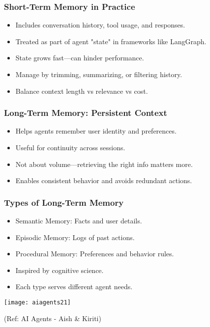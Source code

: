 \begin{frame}[fragile]\frametitle{Short-Term Memory in Practice}
\begin{itemize}
  \item Includes conversation history, tool usage, and responses.
  \item Treated as part of agent "state" in frameworks like LangGraph.
  \item State grows fast—can hinder performance.
  \item Manage by trimming, summarizing, or filtering history.
  \item Balance context length vs relevance vs cost.
\end{itemize}
\end{frame}

\begin{frame}[fragile]\frametitle{Long-Term Memory: Persistent Context}
\begin{itemize}
  \item Helps agents remember user identity and preferences.
  \item Useful for continuity across sessions.
  \item Not about volume—retrieving the right info matters more.
  \item Enables consistent behavior and avoids redundant actions.
\end{itemize}
\end{frame}

\begin{frame}[fragile]\frametitle{Types of Long-Term Memory}


		\begin{itemize}
		  \item Semantic Memory: Facts and user details.
		  \item Episodic Memory: Logs of past actions.
		  \item Procedural Memory: Preferences and behavior rules.
		  \item Inspired by cognitive science.
		  \item Each type serves different agent needs.
		\end{itemize}

		\begin{center}
		\texttt{[image: aiagents21]}

		{\tiny (Ref: AI Agents - Aish \& Kiriti)}

		\end{center}
\end{frame}

